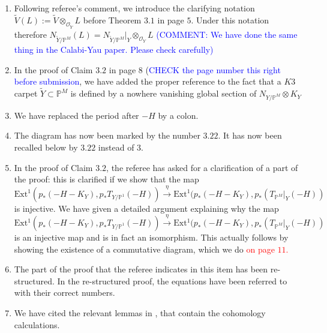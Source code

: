 \documentclass[11pt,twoside]{amsart}
\theoremstyle{plain}
\numberwithin{equation}{section}
\theoremstyle{definition}
\begin{document}
\begin{enumerate}
\item[$(9)$] Following referee's comment, we introduce the clarifying notation $\widetilde{V}(L):=\widetilde{V}\otimes_{\mathcal{O}_{\widetilde{Y}}} L$ before Theorem $3.1$ in page $5$. Under this notation therefore $N_{\widetilde{Y}/\mathbb{P}^M}(L) = N_{\widetilde{Y}/\mathbb{P}^M}|_Y \otimes_{\mathcal{O}_Y}L$ \textcolor{blue}{(COMMENT: We have done the same thing in the Calabi-Yau paper. Please check carefully)}

\item[$(10)$] In the proof of Claim $3.2$ in page $8$ (\textcolor{blue}{CHECK the page number this right before submission}, we have added the proper reference to the fact that a $K3$ carpet $\widetilde{Y} \subset \mathbb{P}^M$ is defined by a nowhere vanishing global section of $N_{Y/\mathbb{P}^M} \otimes K_Y$ 

\item[$(11)$] We have replaced the period after $-H$ by a colon.

\item[$(12)$] The diagram has now been marked by the number $3.22$. It has now been recalled below by $3.22$ instead of $3$.   

\item[$(13)$] In the proof of Claim $3.2$, the referee has asked for a clarification of a part of the proof: this is clarified if we show that the map $\operatorname{Ext^1}(p_*(-H-K_Y), 
 p_*T_{Y/\mathbb{P}^1}(-H))  \xrightarrow[]{\eta} \operatorname{Ext^1}(p_*(-H-K_Y), 
 p_*(T_{\mathbb{P}^M}|_Y(-H))$ is injective.  We have given a detailed argument explaining why the map \\ $\operatorname{Ext^1}(p_*(-H-K_Y), 
 p_*T_{Y/\mathbb{P}^1}(-H))  \xrightarrow[]{\eta} \operatorname{Ext^1}(p_*(-H-K_Y), 
 p_*(T_{\mathbb{P}^M}|_Y(-H))$ is an injective map and is in fact an isomorphism. This actually follows by showing the existence of a commutative diagram, which we do \textcolor{red}{on page $11$.} 

\item[$(14)$] The part of the proof that the referee indicates in this item has been re-structured. In the re-structured proof, the equations have been referred to with their correct numbers.

\item[$(15)$] We have cited the relevant lemmas in \cite{BMR21}, that contain the cohomology calculations.


\end{enumerate}
\end{document}
